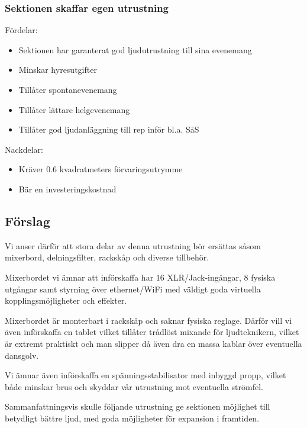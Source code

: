 \documentclass[../_main/handlingar.tex]{subfiles}
\begin{document}
   \subsubsection*{Sektionen skaffar egen utrustning}
    Fördelar: 
    \begin{itemize}
        \item Sektionen har garanterat god ljudutrustning till sina evenemang
        \item Minskar hyresutgifter
        \item Tillåter spontanevenemang
        \item Tillåter lättare helgevenemang
        \item Tillåter god ljudanläggning till rep inför bl.a. SåS
    \end{itemize}

    Nackdelar: 
    \begin{itemize}
        \item Kräver 0.6 kvadratmeters förvaringsutrymme
        \item Bär en investeringskostnad
    \end{itemize}

    \subsection*{Förslag}
    Vi anser därför att stora delar av denna utrustning bör ersättas såsom mixerbord, delningsfilter, rackskåp och diverse tillbehör. 

    Mixerbordet vi ämnar att införskaffa har 16 XLR/Jack-ingångar, 8 fysiska utgångar samt styrning över ethernet/WiFi med väldigt goda virtuella kopplingsmöjligheter och effekter. 

    Mixerbordet är monterbart i rackskåp och saknar fysiska reglage. Därför vill vi även införskaffa en tablet vilket tillåter trådlöst mixande för ljudteknikern, vilket är extremt praktiskt och man slipper då även dra en massa kablar över eventuella dansgolv. 
    
    Vi ämnar även införskaffa en spänningsstabilisator med inbyggd propp, vilket både minskar brus och skyddar vår utrustning mot eventuella strömfel. 
    
    Sammanfattningsvis skulle följande utrustning ge sektionen möjlighet till betydligt bättre ljud, med goda möjligheter för expansion i framtiden. 
    
\end{document}
